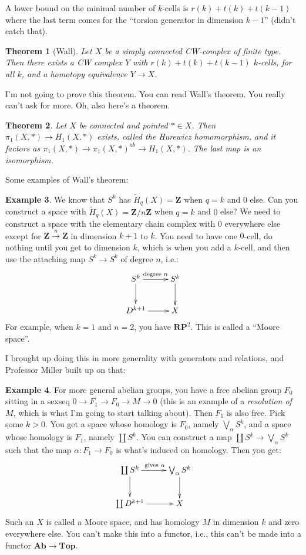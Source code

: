 \documentclass{amsart}
\theoremstyle{theorem}
\newtheorem{theorem}{Theorem}[section]
\theoremstyle{definition}
\newtheorem{example}[theorem]{Example}
\newcommand{\RP}{\mathbf{RP}}
\newcommand{\Z}{\mathbf Z}
\begin{document}
A lower bound on the minimal number of $k$-cells is $r(k)+t(k)+t(k-1)$ where the last term comes for the ``torsion generator in dimension $k-1$'' (didn't catch that).
\begin{theorem}[Wall]
Let $X$ be a simply connected CW-complex of finite type. Then there exists a CW complex $Y$ with $r(k)+t(k)+t(k-1)$ $k$-cells, for all $k$, and a homotopy equivalence $Y\to X$.
\end{theorem}
I'm not going to prove this theorem. You can read Wall's theorem. You really can't ask for more. Oh, also here's a theorem.
\begin{theorem}
Let $X$ be connected and pointed $\ast\in X$. Then $\pi_1(X,\ast)\to H_1(X,\ast)$ exists, called the Hurewicz homomorphism, and it factors as $\pi_1(X,\ast)\to \pi_1(X,\ast)^{ab}\to H_1(X,\ast)$. The last map is an isomorphism.
\end{theorem}
Some examples of Wall's theorem:
\begin{example}
We know that $S^k$ has $\widetilde{ H}_q(X)=\Z$ when $q=k$ and $0$ else. Can you construct a space with $\widetilde{ H}_q(X)=\Z/n\Z$ when $q=k$ and $0$ else? We need to construct a space with the elementary chain complex with $0$ everywhere else except for $\Z\xrightarrow{n}\Z$ in dimension $k+1$ to $k$. You need to have one $0$-cell, do nothing until you get to dimension $k$, which is when you add a $k$-cell, and then use the attaching map $S^k\to S^k$ of degree $n$, i.e.:
\begin{equation*}
\xymatrix{S^k\ar[r]^{\text{degree }n}\ar[d] & S^k\ar[d]\\
D^{k+1}\ar[r] & X}
\end{equation*}
For example, when $k=1$ and $n=2$, you have $\RP^2$. This is called a ``Moore space''.
\end{example}
I brought up doing this in more generality with generators and relations, and Professor Miller built up on that:
\begin{example}
For more general abelian groups, you have a free abelian group $F_0$ sitting in a sexseq $0\to F_1\to F_0\to M\to 0$ (this is an example of a \emph{resolution of $M$}, which is what I'm going to start talking about). Then $F_1$ is also free. Pick some $k>0$. You get a space whose homology is $F_0$, namely $\bigvee_\alpha S^k$, and a space whose homology is $F_1$, namely $\coprod S^k$. You can construct a map $\coprod S^k\to \bigvee_\alpha S^k$ such that the map $\alpha:F_1\to F_0$ is what's induced on homology. Then you get:
\begin{equation*}
\xymatrix{\coprod S^k\ar[r]^{\text{gives }\alpha}\ar[d] & \bigvee_\alpha S^k\ar[d]\\
\coprod D^{k+1}\ar[r] & X}
\end{equation*}
Such an $X$ is called a Moore space, and has homology $M$ in dimension $k$ and zero everywhere else. You can't make this into a functor, i.e., this can't be made into a functor $\mathbf{Ab}\to\mathbf{Top}$.
\end{example}
\end{document}
